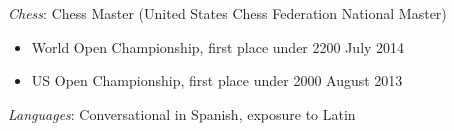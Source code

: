 \documentclass[11pt]{article}
\begin{document}
\begin{adjustwidth}{-2.2cm}{-2.2cm}
    \eosec
    \emph{Chess}: Chess Master (United States Chess Federation National Master)
    \begin{itemize}[nosep]
        \item World Open Championship, first place under 2200 \hfill July 2014
        \item US Open Championship, first place under 2000 \hfill August 2013
    \end{itemize}
    \emph{Languages}: Conversational in Spanish, exposure to Latin
\end{adjustwidth}
\end{document}
